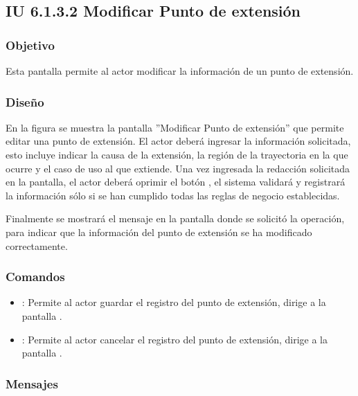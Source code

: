 \subsection{IU 6.1.3.2 Modificar Punto de extensión}

\subsubsection{Objetivo}
	Esta pantalla permite al actor modificar la información de un punto de extensión.
\subsubsection{Diseño}
	En la figura  se muestra la pantalla ''Modificar Punto de extensión'' que permite editar una punto de extensión. El actor deberá ingresar la información solicitada, esto incluye indicar la causa de la extensión, la región de la trayectoria en la que ocurre y el caso de uso al que extiende.
	Una vez ingresada la redacción solicitada en la pantalla, el actor deberá oprimir el botón , el sistema validará y registrará la información sólo si se han cumplido todas las reglas de negocio establecidas.
	
	Finalmente se mostrará el mensaje  en la pantalla donde se solicitó la operación, para indicar que la información del punto de extensión se ha modificado correctamente.

\subsubsection{Comandos}
\begin{itemize}
	\item {}: Permite al actor guardar el registro del punto de extensión, dirige a la pantalla .
	\item {}: Permite al actor cancelar el registro del punto de extensión, dirige a la pantalla .
\end{itemize}

\subsubsection{Mensajes}


